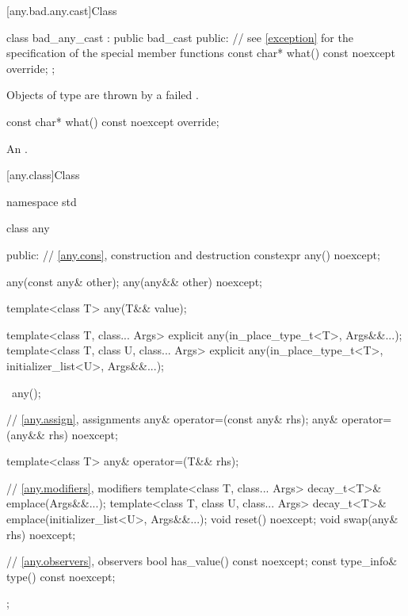 [any.bad.any.cast]{Class }

%
\begin{codeblock}
class bad_any_cast : public bad_cast {
public:
  // see \ref{exception} for the specification of the special member functions
  const char* what() const noexcept override;
};
\end{codeblock}

\pnum
Objects of type  are thrown by a failed .

%
\begin{itemdecl}
const char* what() const noexcept override;
\end{itemdecl}

\begin{itemdescr}
\pnum
\returns
An  \ntbs{}.
\end{itemdescr}

[any.class]{Class }

\begin{codeblock}
namespace std {
  class any {
  public:
    // \ref{any.cons}, construction and destruction
    constexpr any() noexcept;

    any(const any& other);
    any(any&& other) noexcept;

    template<class T>
      any(T&& value);

    template<class T, class... Args>
      explicit any(in_place_type_t<T>, Args&&...);
    template<class T, class U, class... Args>
      explicit any(in_place_type_t<T>, initializer_list<U>, Args&&...);

    ~any();

    // \ref{any.assign}, assignments
    any& operator=(const any& rhs);
    any& operator=(any&& rhs) noexcept;

    template<class T>
      any& operator=(T&& rhs);

    // \ref{any.modifiers}, modifiers
    template<class T, class... Args>
      decay_t<T>& emplace(Args&&...);
    template<class T, class U, class... Args>
      decay_t<T>& emplace(initializer_list<U>, Args&&...);
    void reset() noexcept;
    void swap(any& rhs) noexcept;

    // \ref{any.observers}, observers
    bool has_value() const noexcept;
    const type_info& type() const noexcept;
  };
}
\end{codeblock}

